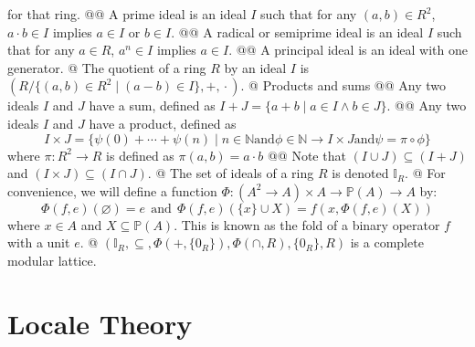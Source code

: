 \documentclass[]{article}
\newcommand{\mbb}[1]{\ensuremath{\mathbb{#1}}}     %
\newcommand{\rmand}{\ensuremath{\mathrel{\mathrm{and}}}}
\newcommand{\comp}[0]{\circ}
\begin{document}
\begin{easylist}[enumerate]
{  for that ring.
}
@@ {%
  A \textsf{prime ideal} is an ideal $I$ such that for any $(a, b) \in R^2$,
  $a \cdot b \in I$ implies $a \in I$ or $b \in I$.
}
@@ {%
  A \textsf{radical} or \textsf{semiprime ideal} is an ideal $I$ such that
  for any $a \in R$, $a^n \in I$ implies $a \in I$.
}
@@ A \textsf{principal ideal} is an ideal with one generator.
@ {%
  The \textsf{quotient of a ring $R$ by an ideal $I$} is
  $(R / \{(a, b) \in R^2 \mid (a - b) \in I\}, +, {}\cdot{})$.
}
@ Products and sums
@@ {%
  Any two ideals $I$ and $J$ have a sum, defined as
  $I + J = \{a + b \mid a \in I \land b \in J\}$.
}
@@ {%
  Any two ideals $I$ and $J$ have a product, defined as
  \begin{equation*}
  I \times J = \{
    \psi(0) + \cdots + \psi(n)
    \mid   n \in \mbb{N}
    \rmand \phi \in \mbb{N} \to I \times J
    \rmand \psi = \pi \comp \phi
  \}
  \end{equation*}
  where $\pi : R^2 \to R$ is defined as $\pi(a, b) = a \cdot b$
}
@@ {%
  Note that $(I \cup J) \subseteq (I + J)$
  and $(I \times J) \subseteq (I \cap J)$.
}
@ The set of ideals of a ring $R$ is denoted $\mbb{I}_R$.
@ {%
  For convenience, we will define a function
  $\Phi : (A^2 \to A) \times A \to \mbb{P}(A) \to A$ by:
  \begin{equation*}
    {\Phi(f, e)(\varnothing) = e}
    ~ ~ \rmand ~ ~
    {\Phi(f, e)(\{x\} \cup X) = f(x, \Phi(f, e)(X))}
  \end{equation*}
  where $x \in A$ and $X \subseteq \mbb{P}(A)$.
  This is known as the \textsf{fold} of a binary operator $f$ with a unit $e$.
}
@ {%
  $(\mbb{I}_R, \subseteq, \Phi(+, \{0_R\}), \Phi(\cap, R), \{0_R\}, R)$
  is a complete modular lattice.
}
\end{easylist}

\section{Locale Theory}
\end{document}
